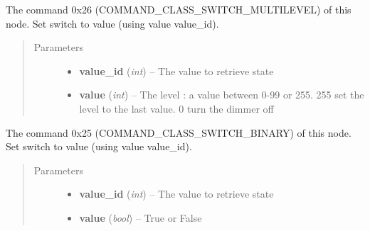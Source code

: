 \documentclass[letterpaper,10pt,english]{sphinxmanual}
\begin{document}
\begin{fulllineitems}
\begin{fulllineitems}
\label{command:openzwave.command.ZWaveNodeSwitch.set_dimmer}
The command 0x26 (COMMAND\_CLASS\_SWITCH\_MULTILEVEL) of this node.
Set switch to value (using value value\_id).
\begin{quote}\begin{description}
\item[{Parameters}] \leavevmode\begin{itemize}
\item {} 
\textbf{value\_id} (\emph{int}) -- The value to retrieve state

\item {} 
\textbf{value} (\emph{int}) -- The level : a value between 0-99 or 255. 255 set the level to the last value.         0 turn the dimmer off

\end{itemize}

\end{description}\end{quote}

\end{fulllineitems}


\begin{fulllineitems}
\label{command:openzwave.command.ZWaveNodeSwitch.set_switch}
The command 0x25 (COMMAND\_CLASS\_SWITCH\_BINARY) of this node.
Set switch to value (using value value\_id).
\begin{quote}\begin{description}
\item[{Parameters}] \leavevmode\begin{itemize}
\item {} 
\textbf{value\_id} (\emph{int}) -- The value to retrieve state

\item {} 
\textbf{value} (\emph{bool}) -- True or False

\end{itemize}

\end{description}\end{quote}

\end{fulllineitems}


\end{fulllineitems}
\end{document}
